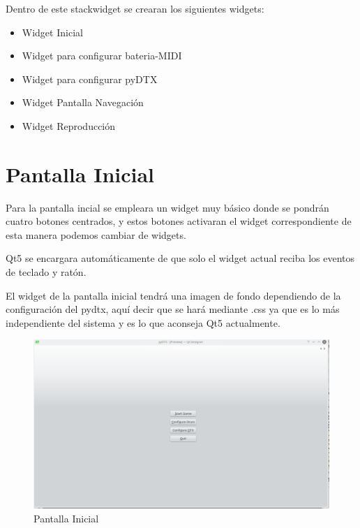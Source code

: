 \documentclass[a4paper,11pt,oneside]{book}
\begin{document}
Dentro de este stackwidget se crearan los siguientes widgets:

 \begin{itemize}
   \item Widget Inicial
   \item Widget para configurar bateria-MIDI
   \item Widget para configurar pyDTX
   \item Widget Pantalla Navegación
   \item Widget Reproducción
 \end{itemize}


 
\section{Pantalla Inicial}
Para la pantalla incial se empleara un widget muy básico donde se pondrán cuatro botones centrados, y estos botones activaran el widget correspondiente de esta manera podemos cambiar de widgets.


Qt5 se encargara automáticamente de que solo el widget actual reciba los eventos de teclado y ratón.

El widget de la pantalla inicial tendrá una imagen de fondo dependiendo de la configuración del pydtx, aquí decir que se hará mediante .css ya que es lo más independiente del sistema y es lo que aconseja Qt5 actualmente.

\begin{figure}[H]
\begin{center}
\includegraphics[scale=0.4]{Imagenes/Main_window.png}
\caption{Pantalla Inicial}
\label{Pantalla Inicial}
\end{center}
\end{figure}
\end{document}
